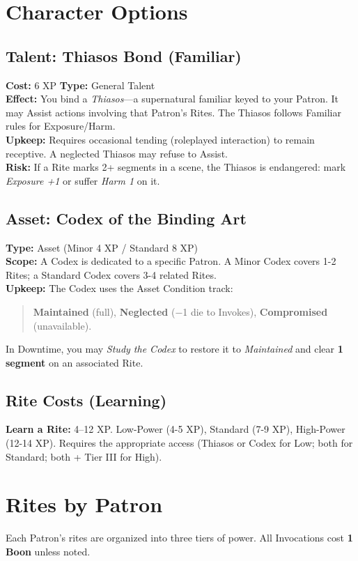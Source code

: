 \documentclass[12pt,twoside]{book}
\begin{document}
\section{Character Options}
\subsection{Talent: Thiasos Bond (Familiar)}
\label{subsec:thiasos-bond}
\textbf{Cost:} 6 XP \hfill \textbf{Type:} General Talent \\
\textbf{Effect:} You bind a \emph{Thiasos}---a supernatural familiar keyed to your Patron. It may Assist actions involving that Patron's Rites. The Thiasos follows Familiar rules for Exposure/Harm.\\
\textbf{Upkeep:} Requires occasional tending (roleplayed interaction) to remain receptive. A neglected Thiasos may refuse to Assist.\\
\textbf{Risk:} If a Rite marks 2+ segments in a scene, the Thiasos is endangered: mark \emph{Exposure +1} or suffer \emph{Harm 1} on it.

\subsection{Asset: Codex of the Binding Art}
\label{subsec:codex-asset}
\textbf{Type:} Asset (Minor 4 XP / Standard 8 XP) \\
\textbf{Scope:} A Codex is dedicated to a specific Patron. A Minor Codex covers 1-2 Rites; a Standard Codex covers 3-4 related Rites.\\
\textbf{Upkeep:} The Codex uses the Asset Condition track:
\begin{quote}
\textbf{Maintained} (full), \textbf{Neglected} (−1 die to Invokes), \textbf{Compromised} (unavailable).
\end{quote}
In Downtime, you may \emph{Study the Codex} to restore it to \emph{Maintained} and clear \textbf{1 segment} on an associated Rite.

\subsection{Rite Costs (Learning)}
\textbf{Learn a Rite:} 4–12 XP. Low-Power (4-5 XP), Standard (7-9 XP), High-Power (12-14 XP). Requires the appropriate access (Thiasos or Codex for Low; both for Standard; both + Tier III for High).

\section{Rites by Patron}
Each Patron's rites are organized into three tiers of power. All Invocations cost \textbf{1 Boon} unless noted.
\end{document}
